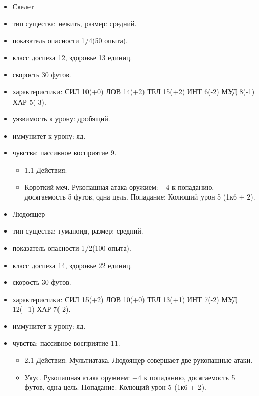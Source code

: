 	\begin{itemize}
		\item Скелет
		\item тип существа: нежить, размер: средний.
		\item показатель опасности 1/4(50 опыта).
		\item класс доспеха 12, здоровье 13 единиц.
		\item скорость 30 футов.
		\item характеристики: СИЛ 10(+0) ЛОВ 14(+2) ТЕЛ 15(+2) ИНТ 6(-2) МУД 8(-1) ХАР 5(-3).
		\item уязвимость к урону: дробящий.
		\item иммунитет к урону: яд.
		\item чувства: пассивное восприятие 9.	
		\begin{itemize}
			\item 1.1 Действия:
			\item Короткий меч. Рукопашная атака оружием: +4 к попаданию, досягаемость 5 футов, одна цель. Попадание: Колющий урон 5 (1к6 + 2).
		\end{itemize}
	\end{itemize}
	\begin{itemize}
		\item Людоящер
		\item тип существа: гуманоид, размер: средний.
		\item показатель опасности 1/2(100 опыта).
		\item класс доспеха 14, здоровье 22 единиц.
		\item скорость 30 футов.
		\item характеристики: СИЛ 15(+2) ЛОВ 10(+0) ТЕЛ 13(+1) ИНТ 7(-2) МУД 12(+1) ХАР 7(-2).
		\item иммунитет к урону: яд.
		\item чувства: пассивное восприятие 11.
		\begin{itemize}
			\item 2.1 Действия: Мультиатака. Людоящер совершает две рукопашные атаки.
			\item Укус. Рукопашная атака оружием: +4 к попаданию, досягаемость 5 футов, одна цель. Попадание: Колющий урон 5 (1к6 + 2).
		\end{itemize}
	\end{itemize}
